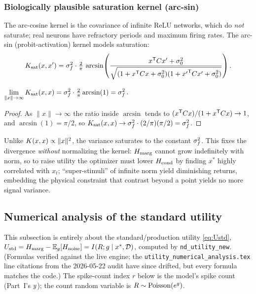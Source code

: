 \subsubsection{Biologically plausible saturation kernel (arc-sin)}
The arc-cosine kernel is the covariance of infinite ReLU networks, which do
\emph{not} saturate; real neurons have refractory periods and maximum firing
rates. The arc-sin (probit-activation) kernel models saturation:
\[
  K_{\mathrm{sat}}(x,x')=\sigma_{f}^{2}\cdot\tfrac2\pi\,\arcsin\!\left(\frac{x^{\mathsf{T}}C x'+\sigma_{0}^2}{\sqrt{(1+x^{\mathsf{T}}C x+\sigma_{0}^2)(1+{x'}^{\mathsf{T}}C x'+\sigma_{0}^2)}}\right).
\]
\begin{proposition}\label{prop:satkernel}
$\displaystyle\lim_{\lVert x\rVert\to\infty}K_{\mathrm{sat}}(x,x)=\sigma_{f}^{2}\cdot\tfrac2\pi\arcsin(1)=\sigma_{f}^{2}$.
\end{proposition}
\begin{proof}
As $\lVert x\rVert\to\infty$ the ratio inside $\arcsin$ tends to
$(x^{\mathsf{T}}C x)/(1+x^{\mathsf{T}}C x)\to1$, and $\arcsin(1)=\pi/2$, so
$K_{\mathrm{sat}}(x,x)\to\sigma_{f}^{2}\cdot(2/\pi)(\pi/2)=\sigma_{f}^{2}$.
\end{proof}
Unlike $K(x,x)\propto\lVert x\rVert^2$, the variance saturates to the constant
$\sigma_{f}^{2}$. This fixes the divergence \emph{without} normalizing the kernel: $H_{\mathrm{marg}}$
cannot grow indefinitely with norm, so to raise utility the optimizer must lower
$H_{\mathrm{cond}}$ by finding $x^*$ highly correlated with $x_t$; ``super-stimuli'' of
infinite norm yield diminishing returns, embedding the physical constraint that
contrast beyond a point yields no more signal variance.

\subsection{Numerical analysis of the standard utility}
\label{subsec:numerics}

This subsection is entirely about the standard/production utility \eqref{eq:Ustd},
$U_{\mathrm{std}}=H_{\mathrm{marg}}-\mathbb{E}_{g}[H_{\mathrm{noise}}]=I(R;g\mid x^*,\mathcal{D})$, computed by
\texttt{nd\_\allowbreak utility\_\allowbreak new}. (Formulas verified against the live engine; the
\texttt{utility\_\allowbreak numerical\_\allowbreak analysis.tex} line citations from the 2026-05-22 audit
have since drifted, but every formula matches the code.) The spike-count index $r$
below is the model's spike count (Part~I's $y$); the count random variable is
$R\sim\mathrm{Poisson}(e^{g})$.

